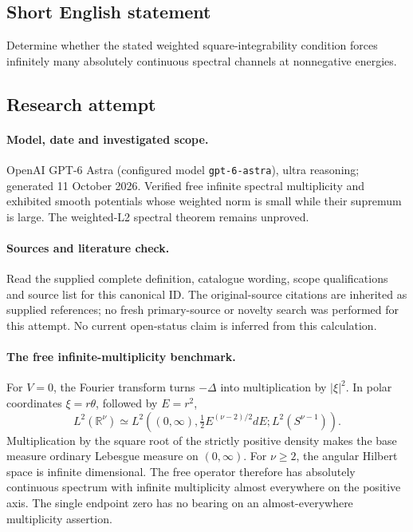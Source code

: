\documentclass[11pt]{article}
\begin{document}
\subsection{Short English statement}
Determine whether the stated weighted square-integrability condition forces infinitely many absolutely continuous spectral channels at nonnegative energies.
\subsection{Research attempt}
\paragraph{Model, date and investigated scope.}
OpenAI GPT-6 Astra (configured model \texttt{gpt-6-astra}), ultra reasoning; generated 11 October 2026. Verified free infinite spectral multiplicity and exhibited smooth potentials whose weighted norm is small while their supremum is large. The weighted-L2 spectral theorem remains unproved.

\paragraph{Sources and literature check.}
Read the supplied complete definition, catalogue wording, scope qualifications and source list for this canonical ID. The original-source citations are inherited as supplied references; no fresh primary-source or novelty search was performed for this attempt. No current open-status claim is inferred from this calculation.

\paragraph{The free infinite-multiplicity benchmark.}For \(V=0\), the Fourier transform turns \(-\Delta\) into multiplication by \(|\xi|^2\). In polar coordinates \(\xi=r\theta\), followed by \(E=r^2\),
\[L^2(\mathbb R^\nu)\simeq L^2\left((0,\infty),\tfrac12E^{(\nu-2)/2}dE;L^2(S^{\nu-1})\right).
\]
Multiplication by the square root of the strictly positive density makes the base measure ordinary Lebesgue measure on \((0,\infty)\). For \(\nu\ge2\), the angular Hilbert space is infinite dimensional. The free operator therefore has absolutely continuous spectrum with infinite multiplicity almost everywhere on the positive axis. The single endpoint zero has no bearing on an almost-everywhere multiplicity assertion.
\end{document}
